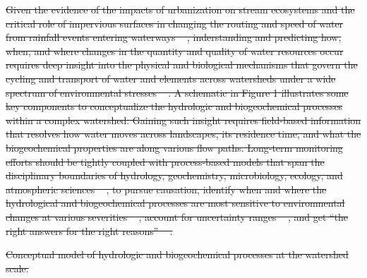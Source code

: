 \documentclass[preprint,review, 12pt]{elsarticle}
\providecommand{\DIFdel}[1]{{\protect\color{red}\sout{#1}}}                      %
\providecommand{\DIFdelbegin}{} %
\providecommand{\DIFdelFL}[1]{\DIFdel{#1}} %
\newcommand{\DIFscaledelfig}{0.5}
\newlength{\DIFdelgraphicswidth} %
\newlength{\DIFdelgraphicsheight} %
\newcommand{\DIFdelincludegraphics}[2][]{%
\sbox{\DIFdelgraphicsbox}{\DIFOincludegraphics[#1]{#2}}%
\settoboxwidth{\DIFdelgraphicswidth}{\DIFdelgraphicsbox} %
\settoboxtotalheight{\DIFdelgraphicsheight}{\DIFdelgraphicsbox} %
\scalebox{\DIFscaledelfig}{%
\parbox[b]{\DIFdelgraphicswidth}{\usebox{\DIFdelgraphicsbox}\\[-\baselineskip] \rule{\DIFdelgraphicswidth}{0em}}\llap{\resizebox{\DIFdelgraphicswidth}{\DIFdelgraphicsheight}{%
\setlength{\unitlength}{\DIFdelgraphicswidth}%
\begin{picture}(1,1)%
\thicklines\linethickness{2pt} %
{\color[rgb]{1,0,0}\put(0,0){\framebox(1,1){}}}%
{\color[rgb]{1,0,0}\put(0,0){\line( 1,1){1}}}%
{\color[rgb]{1,0,0}\put(0,1){\line(1,-1){1}}}%
\end{picture}%
}\hspace*{3pt}}} %
} %
\DeclareRobustCommand{\DIFdelbegin}{\DIFOdelbegin \let\includegraphics\DIFdelincludegraphics} %
\begin{document}
\DIFdelbegin \DIFdel{Given the evidence of the impacts of urbanization on stream ecosystems and the critical role of impervious surfaces in changing the routing and speed of water from rainfall events entering waterways \mbox{%
\citep{Fletcher2013Emily}}\hspace{0pt}%
, 
inderstanding and predicting how, when, and where changes in the quantity and quality of water resources occur requires deep insight into the physical and biological mechanisms that govern the cycling and transport of water and elements across watersheds under a wide spectrum of environmental stresses \mbox{%
\citep{Laudon2018b}}\hspace{0pt}%
. A schematic in Figure 1 illustrates some key components to conceptualize the hydrologic and biogeochemical processes within a complex watershed. Gaining such insight requires field-based information that resolves how water moves across landscapes, its residence time, and what the biogeochemical properties are along various flow paths. Long-term monitoring efforts should be tightly coupled with process-based models that span the disciplinary boundaries of hydrology, geochemistry, microbiology, ecology, and atmospheric sciences \mbox{%
\citep{Bao2017b, Seibert2002}}\hspace{0pt}%
, to pursue causation, identify when and where the hydrological and biogeochemical processes are most sensitive to environmental changes at various severities \mbox{%
\citep{Laudon2018b, Murdoch2014}}\hspace{0pt}%
, account for uncertainty ranges \mbox{%
\citep{Fatichi2016}}\hspace{0pt}%
, and get “the right answers for the right reasons” \mbox{%
\citep{kirchner2006getting}}\hspace{0pt}%
.  
 }%

{%
\DIFdelFL{Conceptual model of hydrologic and biogeochemical processes at the watershed scale.}}
\end{document}

